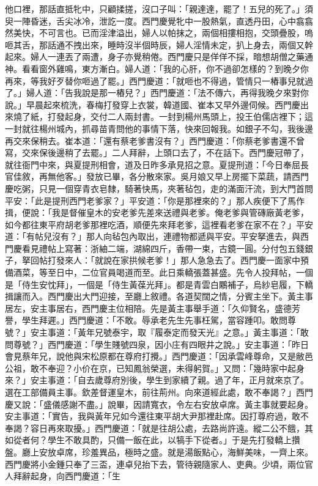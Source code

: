 他口裡，那話直抵牝中，只顧揉搓，沒口子叫：「親達達，罷了！五兒的死了。」須臾一陣昏迷，舌尖冰冷，泄訖一度。西門慶覺牝中一股熱氣，直透丹田，心中翕翕然美快，不可言也。已而淫津溢出，婦人以帕抹之，兩個相摟相抱，交頭疊股，嗚咂其舌，那話通不拽出來，睡時沒半個時辰，婦人淫情未定，扒上身去，兩個又幹起來。婦人一連丟了兩遭，身子亦覺稍倦。西門慶只是佯佯不採，暗想胡僧之藥通神。看看窗外雞鳴，東方漸白。婦人道：「我的心肝，你不過卻怎樣的？到晚夕你再來，等我好歹替你咂過了罷。」西門慶道：「就咂也不得過，管情只一樁事兒就過了。」婦人道：「告我說是那一樁兒？」西門慶道：「法不傳六，再得我晚夕來對你說。」早晨起來梳洗，春梅打發穿上衣裳，韓道國、崔本又早外邊伺候。西門慶出來燒了紙，打發起身，交付二人兩封書。一封到楊州馬頭上，投王伯儒店裡下；這一封就往楊州城內，抓尋苗青問他的事情下落，快來回報我。如銀子不勾，我後邊再交來保稍去。崔本道：「還有蔡老爹書沒有？」西門慶道：「你蔡老爹書還不曾寫，交來保後邊稍了去罷。」二人拜辭，上頭口去了，不在話下。西門慶冠帶了，就往衙門中來，與夏提刑相會，道及日昨多承見招之意。夏提刑道：「今日奉屈長官佳敘，再無他客。」發放已畢，各分散來家。吳月娘又早上房擺下菜蔬，請西門慶吃粥，只見一個穿青衣皂隸，騎著快馬，夾著毡包，走的滿面汗流，到大門首問平安：「此是提刑西門老爹家？」平安道：「你是那裡來的？」那人疾便下了馬作揖，便說：「我是督催皇木的安老爹先差來送禮與老爹。俺老爹與管磚廠黃老爹，如今都往東平府胡老爹那裡吃酒，順便先來拜老爹，這裡看老爹在家不在？」平安道：「有帖兒沒有？」那人向毡包內取出，連禮物都遞與平安。平安拏進去，與西門慶看見禮帖上寫著：浙紬二端，湖綿四斤，香帶一束，古鏡一圓。分付包五錢銀子，拏回帖打發來人：「就說在家拱候老爹！」那人急急去了。西門慶一面家中預備酒菜，等至日中，二位官員喝道而至。此日乘轎張蓋甚盛。先令人投拜帖，一個是「侍生安忱拜」，一個是「侍生黃葆光拜」。都是青雲白鷴補子，烏紗皂履，下轎揖讓而入。西門慶出大門迎接，至廳上敘禮。各道契闊之情，分賓主坐下。黃主事居左，安主事居右，西門慶主位相陪。先是黃主事舉手道：「久仰賢名，盛德芳譽，學生拜遲。」西門慶道：「不敢。辱承老先生先事枉駕，當容踵叩。敢問尊號？」安主事道：「黃年兄號泰宇，取『履泰定而發天光』之意。」黃主事道：「敢問尊號？」西門慶道：「學生賤號四泉，因小庄有四眼井之說。」安主事道：「昨日會見蔡年兄，說他與宋松原都在尊府打攪。」西門慶道：「因承雲峰尊命，又是敝邑公祖，敢不奉迎？小价在京，已知鳳翁榮選，未得躬賀。」又問：「幾時家中起身來？」安主事道：「自去歲尊府別後，學生到家續了親。過了年，正月就來京了。選在工部備員主事。欽差督運皇木，前往荊州。向來道經此處，敢不奉謁？」西門慶又說：「盛儀感謝不盡。」說畢，因請寬衣，令左右安放卓席。黃主事就要起身。安主事道：「實告，我與黃年兄如今還往東平胡大尹那裡赴席。因打尊府過，敢不奉謁？容日再來取擾。」西門慶道：「就是往胡公處，去路尚許遠。縱二公不餓，其如從者何？學生不敢具酌，只備一飯在此，以犒手下從者。」于是先打發轎上攢盤。廳上安放卓席，珍羞異品，極時之盛。就是湯飯點心，海鮮美味，一齊上來。西門慶將小金鍾只奉了三盃，連卓兒抬下去，管待親隨家人、吏典。少頃，兩位官人拜辭起身，向西門慶道：「生